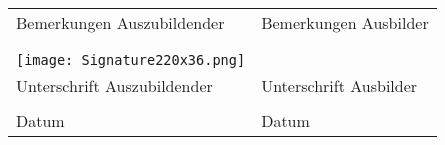 \documentclass[10.5pt]{article}
\begin{document}
\begin{table}[h!]
	\begin{tabular}{| p{7.7cm} |p{7.7cm} |}
		\hline	
		Bemerkungen Auszubildender&Bemerkungen Ausbilder \rule{0pt}{2ex}\\
		&\\
		&\\
		\hline

		\texttt{[image: Signature220x36.png]}&\\ %

		Unterschrift Auszubildender&Unterschrift Ausbilder\\
		\hline
		&\\
		Datum \hspace{1.5cm} &Datum\\
		\hline
	\end{tabular}
\end{table}
\end{document}
